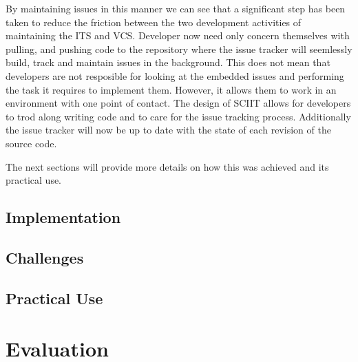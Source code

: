 \documentclass{mproj}
\begin{document}

By maintaining issues in this manner we can see that a significant step has been taken to reduce the friction between the two development activities of maintaining the ITS and VCS. Developer now need only concern themselves with pulling, and pushing code to the repository where the issue tracker will seemlessly build, track and maintain issues in the background. This does not mean that developers are not resposible for looking at the embedded issues and performing the task it requires to implement them. However, it allows them to work in an environment with one point of contact. The design of SCIIT allows for developers to trod along writing code and to care for the issue tracking process. Additionally the issue tracker will now be up to date with the state of each revision of the source code.

The next sections will provide more details on how this was achieved and its practical use.


\section{Implementation}






\section{Challenges}

\section{Practical Use}
\chapter{Evaluation}\label{evaluation}
\end{document}
